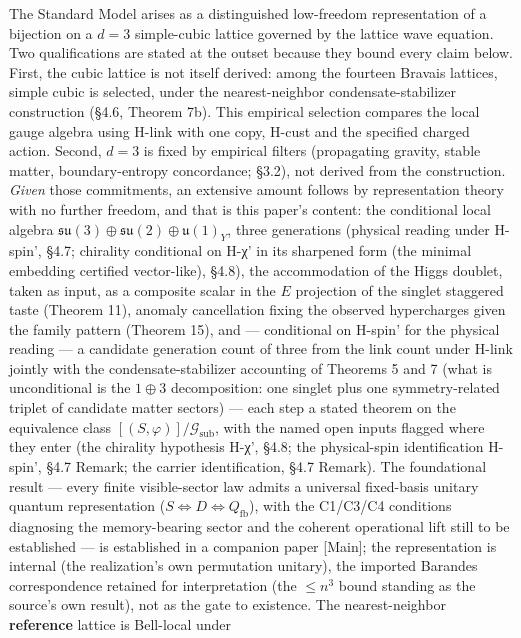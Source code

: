 \documentclass[
]{article}
\begin{document}
The Standard Model arises as a distinguished low-freedom representation
of a bijection on a \(d = 3\) simple-cubic lattice governed by the
lattice wave equation. Two qualifications are stated at the outset
because they bound every claim below. First, the cubic lattice is not
itself derived: among the fourteen Bravais lattices, simple cubic is
selected, under the nearest-neighbor condensate-stabilizer construction
(§4.6, Theorem 7b). This empirical selection compares the local gauge
algebra using H-link with one copy, H-cust and the specified charged
action. Second, \(d=3\) is fixed by empirical filters (propagating
gravity, stable matter, boundary-entropy concordance; §3.2), not derived
from the construction. \emph{Given} those commitments, an extensive
amount follows by representation theory with no further freedom, and
that is this paper's content: the conditional local algebra
\(\mathfrak{su}(3)\oplus\mathfrak{su}(2)\oplus\mathfrak u(1)_Y\), three
generations (physical reading under H-spin', §4.7; chirality conditional
on H-χ' in its sharpened form (the minimal embedding certified
vector-like), §4.8), the accommodation of the Higgs doublet, taken as
input, as a composite scalar in the \(E\) projection of the singlet
staggered taste (Theorem 11), anomaly cancellation fixing the observed
hypercharges given the family pattern (Theorem 15), and --- conditional
on H-spin' for the physical reading --- a candidate generation count of
three from the link count under H-link jointly with the
condensate-stabilizer accounting of Theorems 5 and 7 (what is
unconditional is the \(1 \oplus 3\) decomposition: one singlet plus one
symmetry-related triplet of candidate matter sectors) --- each step a
stated theorem on the equivalence class
\([(S, \varphi)]/\mathcal{G}_{\text{sub}}\), with the named open inputs
flagged where they enter (the chirality hypothesis H-χ', §4.8; the
physical-spin identification H-spin', §4.7 Remark; the carrier
identification, §4.7 Remark). The foundational result --- every finite
visible-sector law admits a universal fixed-basis unitary quantum
representation (\(S \iff D \iff Q_{\mathrm{fb}}\)), with the C1/C3/C4
conditions diagnosing the memory-bearing sector and the coherent
operational lift still to be established --- is established in a
companion paper {[}Main{]}; the representation is internal (the
realization's own permutation unitary), the imported Barandes
correspondence retained for interpretation (the \(\leq n^3\) bound
standing as the source's own result), not as the gate to existence. The
nearest-neighbor \textbf{reference} lattice is Bell-local under
\end{document}
